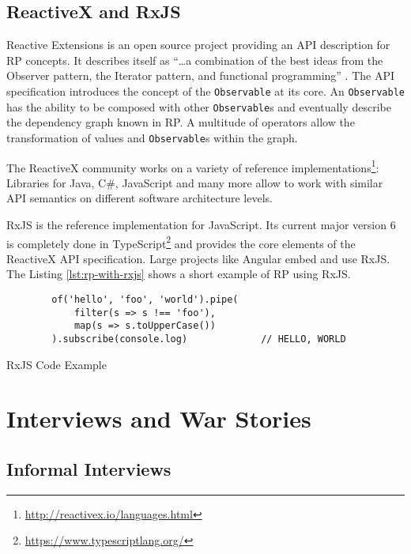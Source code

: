 \documentclass[12pt,a4paper]{article}
\begin{document}
\subsection{ReactiveX and RxJS}

Reactive Extensions is an open source project providing an API description for RP concepts. It describes itself as ``\dots a combination of the best ideas from the Observer pattern, the Iterator pattern, and functional programming'' \cite{reactivex}.  The API specification introduces the concept of the  \texttt{Observable} at its core. An \texttt{Observable} has the ability to be composed with other \texttt{Observable}s and eventually describe the dependency graph known in RP. A multitude of operators allow the transformation of values and \texttt{Observable}s within the graph.

The ReactiveX community works on a variety of reference implementations\footnote{\url{http://reactivex.io/languages.html}}: Libraries for Java, C\#, JavaScript and many more allow to work with similar API semantics on different software architecture levels.

RxJS is the reference implementation for JavaScript. Its current major version 6 is completely done in TypeScript\footnote{\url{https://www.typescriptlang.org/}} and provides the core elements of the ReactiveX API specification. Large projects like Angular embed and use RxJS\cite{angualrrxjs}. The Listing \ref{lst:rp-with-rxjs} shows a short example of RP using RxJS.

\begin{listing}[H]
	\begin{verbatim}
		of('hello', 'foo', 'world').pipe(
			filter(s => s !== 'foo'),
			map(s => s.toUpperCase())
		).subscribe(console.log)             // HELLO, WORLD
	\end{verbatim}
	\caption{RxJS Code Example}
	\label{lst:rp-with-rxjs}
\end{listing}

\section{Interviews and War Stories}
\label{sec:interviews}

\subsection{Informal Interviews}
\end{document}
